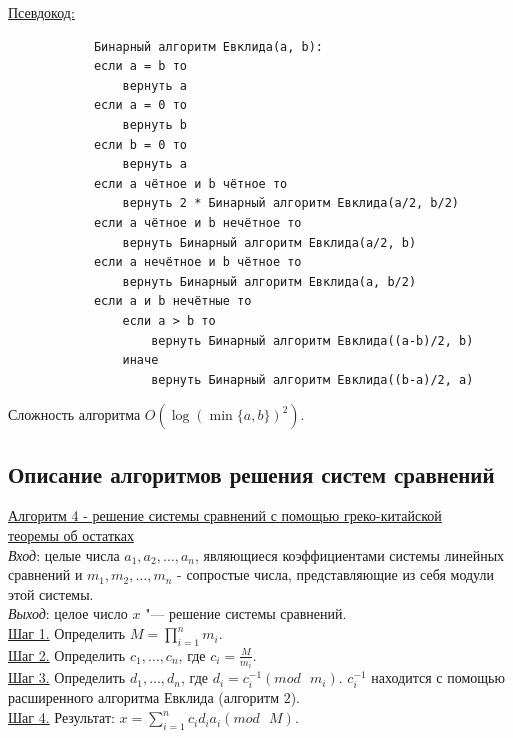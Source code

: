 \documentclass[bachelor, och, labwork]{SCWorks}
\begin{document}
        \underline{Псевдокод:}
            \begin{verbatim}
            Бинарный алгоритм Евклида(a, b):
            если a = b то
                вернуть a
            если a = 0 то
                вернуть b
            если b = 0 то
                вернуть a
            если a чётное и b чётное то
                вернуть 2 * Бинарный алгоритм Евклида(a/2, b/2)
            если a чётное и b нечётное то
                вернуть Бинарный алгоритм Евклида(a/2, b)
            если a нечётное и b чётное то
                вернуть Бинарный алгоритм Евклида(a, b/2)
            если a и b нечётные то
                если a > b то
                    вернуть Бинарный алгоритм Евклида((a-b)/2, b)
                иначе
                    вернуть Бинарный алгоритм Евклида((b-a)/2, a)                      
            \end{verbatim}

            Сложность алгоритма $O(\log(\min\{a, b\})^2)$.\\
        
    \subsection{Описание  алгоритмов  решения систем сравнений}

        \underline{Алгоритм 4 - решение системы сравнений с помощью греко-китайской}\\
        \underline{теоремы об остатках}\\
            \textit{Вход}: целые числа $a_1, a_2, \dots, a_n$, являющиеся коэффициентами системы линейных сравнений и $m_1, m_2,
            \dots, m_n$ - сопростые числа, представляющие из себя модули этой системы.\\
            \textit{Выход}: целое число $x$ "--- решение системы сравнений.\\
            \underline{Шаг 1.} Определить $M = \prod_{i = 1}^{n} m_i$.\\
            \underline{Шаг 2.} Определить $c_1, \dots, c_n$, где $c_i =
            \frac{M}{m_i}$.\\
            \underline{Шаг 3.} Определить $d_1, \dots, d_n$, где $d_i = c^{-1}_i
            (mod \text{ } m_i)$. $c^{-1}_i$ находится с помощью расширенного алгоритма
            Евклида (алгоритм $2$).\\
            \underline{Шаг 4.} Результат: $x = \sum_{i = 1}^{n} c_i d_i a_i (mod \text{ } M)$.\\
\end{document}
